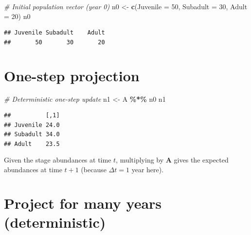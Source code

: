 \documentclass[
  a4paper]{book}
\newenvironment{Shaded}{\begin{snugshade}}{\end{snugshade}}
\newcommand{\AttributeTok}[1]{\textcolor[rgb]{0.13,0.29,0.53}{#1}}
\newcommand{\CommentTok}[1]{\textcolor[rgb]{0.56,0.35,0.01}{\textit{#1}}}
\newcommand{\DecValTok}[1]{\textcolor[rgb]{0.00,0.00,0.81}{#1}}
\newcommand{\FunctionTok}[1]{\textcolor[rgb]{0.13,0.29,0.53}{\textbf{#1}}}
\newcommand{\NormalTok}[1]{#1}
\newcommand{\OtherTok}[1]{\textcolor[rgb]{0.56,0.35,0.01}{#1}}
\newcommand{\SpecialCharTok}[1]{\textcolor[rgb]{0.81,0.36,0.00}{\textbf{#1}}}
\begin{document}
\begin{Shaded}
\begin{Highlighting}[]
\CommentTok{\# Initial population vector (year 0)}
\NormalTok{n0 }\OtherTok{\textless{}{-}} \FunctionTok{c}\NormalTok{(}\AttributeTok{Juvenile =} \DecValTok{50}\NormalTok{, }\AttributeTok{Subadult =} \DecValTok{30}\NormalTok{, }\AttributeTok{Adult =} \DecValTok{20}\NormalTok{)}
\NormalTok{n0}
\end{Highlighting}
\end{Shaded}

\begin{verbatim}
## Juvenile Subadult    Adult 
##       50       30       20
\end{verbatim}

\section{One-step projection}\label{one-step-projection}

\begin{Shaded}
\begin{Highlighting}[]
\CommentTok{\# Deterministic one{-}step update}
\NormalTok{n1 }\OtherTok{\textless{}{-}}\NormalTok{ A }\SpecialCharTok{\%*\%}\NormalTok{ n0}
\NormalTok{n1}
\end{Highlighting}
\end{Shaded}

\begin{verbatim}
##          [,1]
## Juvenile 24.0
## Subadult 34.0
## Adult    23.5
\end{verbatim}

Given the stage abundances at time \(t\), multiplying by \(\mathbf{A}\) gives the expected abundances at time \(t+1\) (because \(\Delta t=1\) year here).

\section{Project for many years (deterministic)}\label{project-for-many-years-deterministic}
\end{document}

